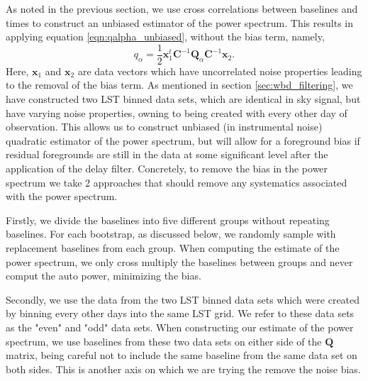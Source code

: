 \documentclass[twocolumn,numberedappendix]{emulateapj} \shorttitle{PSA64}
\newcommand{\x}{\mathbf{x}} \newcommand{\xhat}{\hat{\mathbf{x}}}
\begin{document}
As noted in the previous section, we use cross correlations between baselines
and times to construct an unbiased estimator of the power spectrum. This results
in applying equation \ref{eqn:qalpha_unbiased}, without the bias term, namely, 
\begin{equation}
\label{eqn:qalpha_nobias}
    q_{\alpha} =
        \frac{1}{2}\x_{1}^{t}\mathbf{C}^{-1}\mathbf{Q}_{\alpha}\mathbf{C}^{-1}\x_{2}.
\end{equation}
Here, $\x_{1}$ and $\x_{2}$ are data vectors which have uncorrelated noise
properties leading to the removal of the bias term. As mentioned in section
\ref{sec:wbd_filtering}, we have constructed two LST binned data sets, which are identical
in sky signal, but have varying noise properties, owning to being created with
every other day of observation.  This allows us to construct unbiased (in
instrumental noise) quadratic estimator of the power spectrum, but will allow
for a foreground bias if residual foregrounds are still in the data at some
significant level after the application of the delay filter. Concretely, to
remove the bias in the power spectrum we take 2 approaches that should remove
any systematics associated with the power spectrum.


Firstly, we divide the baselines into five different groups without repeating
baselines. For each bootstrap, as discussed below, we randomly sample with
replacement baselines from each group. When computing the estimate of the power
spectrum, we only cross multiply the baselines between groups and never comput
the auto power, minimizing the bias.

Secondly, we use the data from the two LST binned data sets which were created
by binning every other days into the same LST grid. We refer to these data sets
as the "even" and "odd" data sets. When constructing our estimate of the power
spectrum, we use baselines from these two data sets on either side of the
$\mathbf{Q}$ matrix, being careful not to include the same baseline from the
same data set on both sides. This is another axis on which we are trying the
remove the noise bias.
\end{document}
